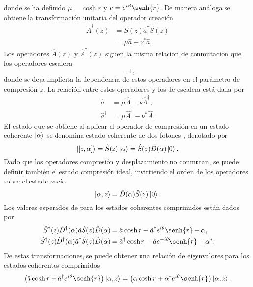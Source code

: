 donde se ha definido $\mu = \cosh{r}$ y $\nu = e^{i\beta}\senh{r}$. De manera análoga se obtiene la transformación unitaria del operador creación
\begin{align}
  \hat{A}^{\dagger}(z) & = \hat{S}(z)\hat{a}^{\dagger} \hat{S}(z) \nonumber \\
                       & = \mu\hat{a} + \nu^* \hat{a}.
\end{align}
Los operadores $\hat{A}(z)$ y $\hat{A}^\dagger(z)$ siguen la misma relación de conmutación que los operadores escalera
\begin{equation}
  [\hat{A}, \hat{A}^{\dagger}] = 1,
\end{equation}
donde se deja implícita la dependencia de estos operadores en el parámetro de compresión $z$. La relación entre estos operadores y los de escalera está dada por
\begin{align}
  \hat{a}           & = \mu \hat{A} - \nu \hat{A}^\dagger,   \\
  \hat{a}^{\dagger} & = \mu \hat{A}^\dagger - \nu^* \hat{A}.
\end{align}
El estado que se obtiene al aplicar el operador de compresión en un estado coherente $\ket{\alpha}$ se denomina estado coherente de dos fotones \cite{Mandel}, denotado por
\begin{equation}
  \ket{[z,\alpha]} = \hat{S}(z)\ket{\alpha} = \hat{S}(z)\hat{D}(\alpha)\ket{0}.
\end{equation}
Dado que los operadores compresión y desplazamiento no conmutan, se puede definir también el estado compresión ideal, invirtiendo el orden de los operadores sobre el estado vacío \cite{Loudon}
\begin{equation}
  \ket{\alpha, z} = \hat{D}(\alpha) \hat{S}(z) \ket{0}.
\end{equation}
Los valores esperados de para los estados coherentes comprimidos están dados por
\begin{align}
  \hat{S}^\dagger(z) \hat{D}^\dagger (\alpha) \hat{a} \hat{S}(z) \hat{D}(\alpha)           & = \hat{a} \cosh{r} - \hat{a}^{\dagger} e^{i\theta}\senh{r} + \alpha,    \\
  \hat{S}^\dagger(z) \hat{D}^\dagger (\alpha) \hat{a}^{\dagger} \hat{S}(z) \hat{D}(\alpha) & = \hat{a}^{\dagger} \cosh{r} - \hat{a} e^{-i\theta}\senh{r} + \alpha^*.
\end{align}
De estas transformaciones, se puede obtener una relación de eigenvalores para los estados coherentes comprimidos
\begin{equation}
  \left( \hat{a} \cosh{r} + \hat{a}^{\dagger} e^{i\theta} \senh{r} \right) \ket{\alpha, z} = \left( \alpha \cosh{r} + \alpha^* e^{i\theta} \senh{r} \right) \ket{\alpha, z}.
\end{equation}
